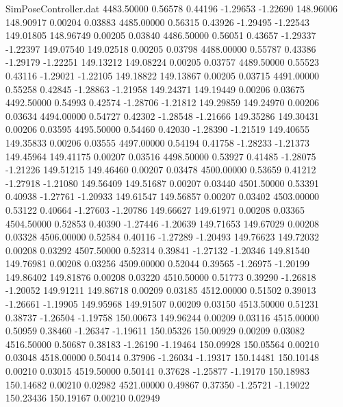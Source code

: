 \begin{filecontents}{SimPoseController.dat}
4483.50000    0.56578    0.44196    -1.29653   -1.22690  148.96006  148.90917    0.00204    0.03883
4485.00000    0.56315    0.43926    -1.29495   -1.22543  149.01805  148.96749    0.00205    0.03840
4486.50000    0.56051    0.43657    -1.29337   -1.22397  149.07540  149.02518    0.00205    0.03798
4488.00000    0.55787    0.43386    -1.29179   -1.22251  149.13212  149.08224    0.00205    0.03757
4489.50000    0.55523    0.43116    -1.29021   -1.22105  149.18822  149.13867    0.00205    0.03715
4491.00000    0.55258    0.42845    -1.28863   -1.21958  149.24371  149.19449    0.00206    0.03675
4492.50000    0.54993    0.42574    -1.28706   -1.21812  149.29859  149.24970    0.00206    0.03634
4494.00000    0.54727    0.42302    -1.28548   -1.21666  149.35286  149.30431    0.00206    0.03595
4495.50000    0.54460    0.42030    -1.28390   -1.21519  149.40655  149.35833    0.00206    0.03555
4497.00000    0.54194    0.41758    -1.28233   -1.21373  149.45964  149.41175    0.00207    0.03516
4498.50000    0.53927    0.41485    -1.28075   -1.21226  149.51215  149.46460    0.00207    0.03478
4500.00000    0.53659    0.41212    -1.27918   -1.21080  149.56409  149.51687    0.00207    0.03440
4501.50000    0.53391    0.40938    -1.27761   -1.20933  149.61547  149.56857    0.00207    0.03402
4503.00000    0.53122    0.40664    -1.27603   -1.20786  149.66627  149.61971    0.00208    0.03365
4504.50000    0.52853    0.40390    -1.27446   -1.20639  149.71653  149.67029    0.00208    0.03328
4506.00000    0.52584    0.40116    -1.27289   -1.20493  149.76623  149.72032    0.00208    0.03292
4507.50000    0.52314    0.39841    -1.27132   -1.20346  149.81540  149.76981    0.00208    0.03256
4509.00000    0.52044    0.39565    -1.26975   -1.20199  149.86402  149.81876    0.00208    0.03220
4510.50000    0.51773    0.39290    -1.26818   -1.20052  149.91211  149.86718    0.00209    0.03185
4512.00000    0.51502    0.39013    -1.26661   -1.19905  149.95968  149.91507    0.00209    0.03150
4513.50000    0.51231    0.38737    -1.26504   -1.19758  150.00673  149.96244    0.00209    0.03116
4515.00000    0.50959    0.38460    -1.26347   -1.19611  150.05326  150.00929    0.00209    0.03082
4516.50000    0.50687    0.38183    -1.26190   -1.19464  150.09928  150.05564    0.00210    0.03048
4518.00000    0.50414    0.37906    -1.26034   -1.19317  150.14481  150.10148    0.00210    0.03015
4519.50000    0.50141    0.37628    -1.25877   -1.19170  150.18983  150.14682    0.00210    0.02982
4521.00000    0.49867    0.37350    -1.25721   -1.19022  150.23436  150.19167    0.00210    0.02949

\end{filecontents}
